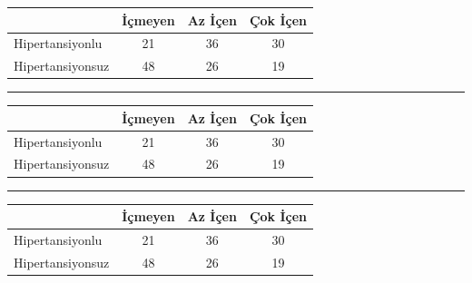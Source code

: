 \documentclass{article}
\renewcommand{\arraystretch}{1.25} %
\begin{document}

\lipsum[1][1-3]

\begin{tabular}{l c c c}
\hline
& İçmeyen & Az İçen & Çok İçen \\
\hline
Hipertansiyonlu & 21 & 36 & 30 \\
Hipertansiyonsuz & 48 & 26 & 19 \\
\hline
\end{tabular}

\lipsum[1][4-5]

\bigskip
\hrule
\bigskip

\lipsum[1][1-3]
\begin{center} %
\begin{tabular}{l c c c}
\hline
& İçmeyen & Az İçen & Çok İçen \\
\hline
Hipertansiyonlu & 21 & 36 & 30 \\
Hipertansiyonsuz & 48 & 26 & 19 \\
\hline
\end{tabular}
\end{center}
\lipsum[1][4-5]

\bigskip
\hrule
\bigskip

\lipsum[1][1-3]

\begingroup
\renewcommand{\arraystretch}{1} %
\begin{center}
\begin{tabular}{l c c c}
\hline
& İçmeyen & Az İçen & Çok İçen \\
\hline
Hipertansiyonlu & 21 & 36 & 30 \\
Hipertansiyonsuz & 48 & 26 & 19 \\
\hline
\end{tabular}
\end{center}
\endgroup

\lipsum[1][4-5]

\newpage


\end{document}

